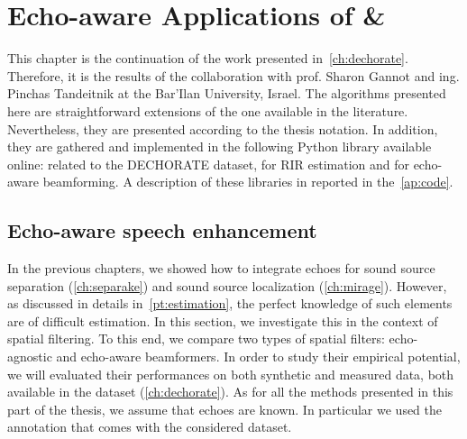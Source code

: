 \chapter{Echo-aware Applications of \& \dEchorate}\label{ch:dechorateapp}


\vspace{-2.5em}
 \synopsisChDecharateApp



\mynewline
This chapter is the continuation of the work presented in~\cref{ch:dechorate}.
Therefore, it is the results of the collaboration with prof. Sharon Gannot and ing. Pinchas Tandeitnik at the Bar'Ilan University, Israel.
The algorithms presented here are straightforward extensions of the one available in the literature.
Nevertheless, they are presented according to the thesis notation.
In addition, they are  gathered and implemented in the following Python library available online:
 related to the \ac{DECHORATE} dataset,  for \acs{RIR} estimation and  for echo-aware beamforming.
A description of these libraries in reported in the~\cref{ap:code}.

\section{Echo-aware speech enhancement}\label{sec:dechorateapp:se}
In the previous chapters, we showed how to integrate echoes for sound source separation (\cref{ch:separake}) and sound source localization (\cref{ch:mirage}).
However, as discussed in details in~\cref{pt:estimation}, the perfect knowledge of such elements are of difficult estimation.
In this section, we investigate this in the context of spatial filtering.
To this end, we compare two types of spatial filters: echo-agnostic and echo-aware beamformers.
In order to study their empirical potential, we will evaluated their performances on both synthetic and measured data, both available in the \dEchorate{} dataset (\cref{ch:dechorate}).
As for all the methods presented in this part of the thesis, we assume that echoes are known.
In particular we used the annotation that comes with the considered dataset.

